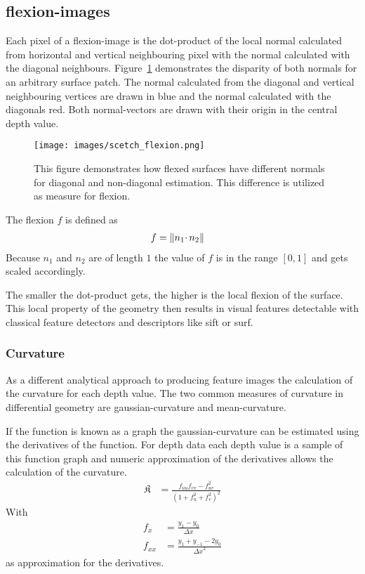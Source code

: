 \subsection{\Glspl{flexion-image}}\label{flexion-image-section}

Each pixel of a \Gls{flexion-image} is the dot-product of the local normal
calculated from horizontal and vertical neighbouring pixel with the
normal calculated with the diagonal neighbours.
Figure~\ref{fig:flexion-image-scetched} demonstrates the disparity of both normals for an arbitrary surface patch.
The normal calculated from the diagonal and vertical neighbouring vertices are drawn in blue and the normal calculated with the diagonals red.
Both normal-vectors are drawn with their origin in the central depth value.

\begin{figure}[H]
    \centering
    \texttt{[image: images/scetch\_flexion.png]}
    \caption[Schematic Representation of Flexion]{This figure demonstrates how flexed surfaces have different normals for diagonal and non-diagonal estimation. This difference is utilized as measure for flexion.}%
    \label{fig:flexion-image-scetched}
\end{figure}

The flexion $f$ is defined as
\begin{align}
    f &= \lVert n_1 \cdotp n_2\rVert
\end{align}
Because $n_1$ and $n_2$ are of length $1$ the value of $f$ is in the range $[0, 1]$ and gets scaled accordingly.

The smaller the dot-product gets, the higher is the local flexion of the
surface. This local property of the geometry then results in visual
features detectable with classical feature detectors and descriptors like
\Gls{sift} or \Gls{surf}.

\subsubsection{Curvature}

As a different analytical approach to producing feature images the calculation of the \gls{curvature} for each depth value.
The two common measures of curvature in differential geometry are \gls{gaussian-curvature} and \gls{mean-curvature}\cite{Kuhnel2008}.

If the function is known as a graph the \Gls{gaussian-curvature} can be estimated using the derivatives of the function.
For depth data each depth value is a sample of this function graph and numeric approximation of the derivatives allows the calculation of the curvature.
\begin{align}
    \mathfrak{K} &= \frac{f_{uu} f_{vv} - f_{uv}^2}{{(1 + f_u^2 + f_v^2)}^2}
\end{align}
With
\begin{align*}
    f_{x} &= \frac{y_1 - y_0}{\Delta x} \\
    f_{xx} &= \frac{y_1 + y_{-1} - 2 y_0}{{\Delta x}^2}
\end{align*}
as approximation for the derivatives.

